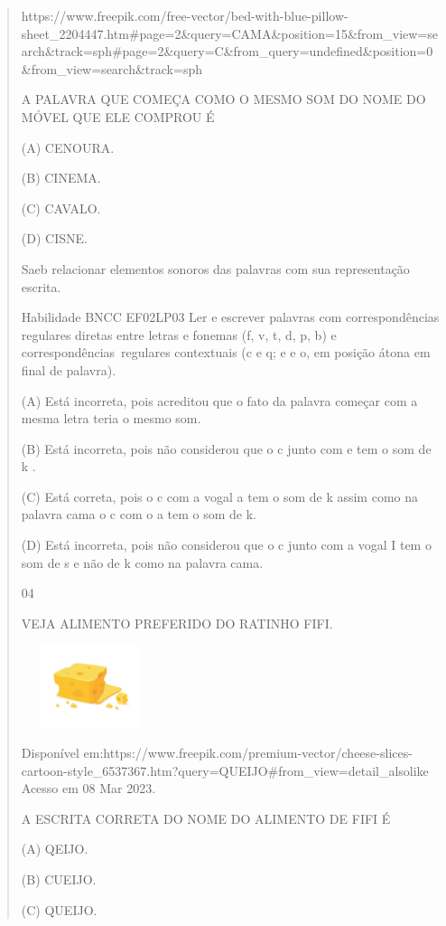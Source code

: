 \begin{verse}
{{{{{{https://www.freepik.com/free-vector/bed-with-blue-pillow-sheet\_2204447.htm\#page=2\&query=CAMA\&position=15\&from\_view=search\&track=sph\#page=2\&query=C\&from\_query=undefined\&position=0\&from\_view=search\&track=sph

\protect\hypertarget{_Hlk129272831}{}{}A PALAVRA QUE COMEÇA COMO O MESMO
SOM DO NOME DO MÓVEL QUE ELE COMPROU É

(A) CENOURA.

(B) CINEMA.

(C) CAVALO.

(D) CISNE.

\protect\hypertarget{_Hlk129152414}{}{\protect\hypertarget{_Hlk129151771}{}{}}Saeb
relacionar elementos sonoros das palavras com sua representação escrita.

Habilidade BNCC EF02LP03 Ler e escrever palavras com correspondências
regulares diretas entre letras e fonemas (f, v, t, d, p, b) e
correspondências~regulares contextuais (c e q; e e o, em posição átona
em final de palavra).

(A) Está incorreta, pois acreditou que o fato da palavra começar com a
mesma letra teria o mesmo som.

(B) Está incorreta, pois não considerou que o c junto com e tem o som de
k .

(C) Está correta, pois o c com a vogal a tem o som de k assim como na
palavra cama o c com o a tem o som de k.

(D) Está incorreta, pois não considerou que o c junto com a vogal I tem
o som de s e não de k como na palavra cama.

\num{04}

VEJA ALIMENTO PREFERIDO DO RATINHO FIFI.

\includegraphics[width=1.56736in,height=0.94861in]{media/image141.jpeg}

Disponível
em:https://www.freepik.com/premium-vector/cheese-slices-cartoon-style\_6537367.htm?query=QUEIJO\#from\_view=detail\_alsolike
Acesso em 08 Mar 2023.

A ESCRITA CORRETA DO NOME DO ALIMENTO DE FIFI É

(A) QEIJO.

(B) CUEIJO.

(C) QUEIJO.

}}}}}}
\end{verse}
